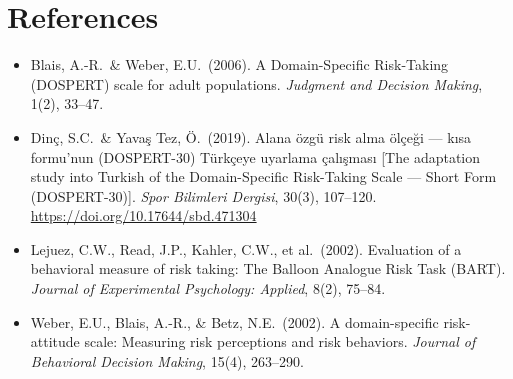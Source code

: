 \documentclass[11pt,a4paper]{article}
\begin{document}
\section*{References}

\begin{itemize}

    \item Blais, A.-R.\ \& Weber, E.U.\ (2006).
        A Domain-Specific Risk-Taking (DOSPERT) scale for adult populations.
        \textit{Judgment and Decision Making}, 1(2), 33--47.

    \item Din\c{c}, S.C.\ \& Yava\c{s} Tez, \"O.\ (2019).
        Alana \"ozg\"u risk alma \"ol\c{c}e\u{g}i --- k{\i}sa formu'nun
        (DOSPERT-30) T\"urk\c{c}eye uyarlama \c{c}al{\i}\c{s}mas{\i}
        [The adaptation study into Turkish of the Domain-Specific Risk-Taking
        Scale --- Short Form (DOSPERT-30)].
        \textit{Spor Bilimleri Dergisi}, 30(3), 107--120.
        \url{https://doi.org/10.17644/sbd.471304}

    \item Lejuez, C.W., Read, J.P., Kahler, C.W., et al.\ (2002).
        Evaluation of a behavioral measure of risk taking: The Balloon Analogue
        Risk Task (BART). \textit{Journal of Experimental Psychology: Applied},
        8(2), 75--84.

    \item Weber, E.U., Blais, A.-R., \& Betz, N.E.\ (2002).
        A domain-specific risk-attitude scale: Measuring risk perceptions and
        risk behaviors. \textit{Journal of Behavioral Decision Making},
        15(4), 263--290.

\end{itemize}
\end{document}
